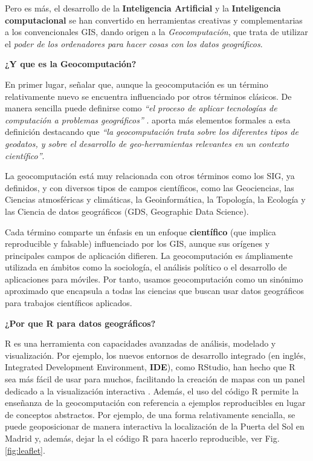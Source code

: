 \documentclass[
]{report}
\begin{document}
Pero es más, el desarrollo de la \textbf{Inteligencia Artificial} y la \textbf{Inteligencia
computacional} se han convertido en herramientas creativas y complementarias a
los convencionales GIS, dando origen a la \emph{Geocomputación}, que trata de
utilizar el \emph{poder de los ordenadores para hacer cosas con los datos
geográficos}.

\textbf{¿Y que es la Geocomputación?}

En primer lugar, señalar que, aunque la geocomputación es un término
relativamente nuevo se encuentra influenciado por otros términos clásicos. De
manera sencilla puede definirse como \emph{``el proceso de aplicar tecnologías de
computación a problemas geográficos''} \citep{rees1998}. \citet{Openshaw_Abrahart_2000}
aporta más elementos formales a esta definición destacando que \emph{``la
geocomputación trata sobre los diferentes tipos de geodatos, y sobre el
desarrollo de geo-herramientas relevantes en un contexto científico''}.

La geocomputación está muy relacionada con otros términos como los SIG, ya
definidos, y con diversos tipos de campos científicos, como las Geociencias, las
Ciencias atmosféricas y climáticas, la Geoinformática, la Topología, la Ecología
y las Ciencia de datos geográficos (GDS, Geographic Data Science).

Cada término comparte un énfasis en un enfoque \textbf{científico} (que implica
reproducible y falsable) influenciado por los GIS, aunque sus orígenes y
principales campos de aplicación difieren. La geocomputación es ámpliamente
utilizada en ámbitos como la sociología, el análisis político o el desarrollo de
aplicaciones para móviles. Por tanto, usamos geocomputación como un sinónimo
aproximado que encapsula a todas las ciencias que buscan usar datos geográficos
para trabajos científicos aplicados.

\textbf{¿Por que R para datos geográficos?}

R es una herramienta con capacidades avanzadas de análisis, modelado y
visualización. Por ejemplo, los nuevos entornos de desarrollo integrado (en
inglés, Integrated Development Environment, \textbf{IDE}), como RStudio, han hecho
que R sea más fácil de usar para muchos, facilitando la creación de mapas con un
panel dedicado a la visualización interactiva \citep{Lovelance_et_al_2019}. Además,
el uso del código R permite la enseñanza de la geocomputación con referencia a
ejemplos reproducibles en lugar de conceptos abstractos. Por ejemplo, de una
forma relativamente sencialla, se puede geoposicionar de manera interactiva la
localización de la Puerta del Sol en Madrid y, además, dejar la el código R para
hacerlo reproducible, ver Fig. \ref{fig:leaflet}.
\end{document}
